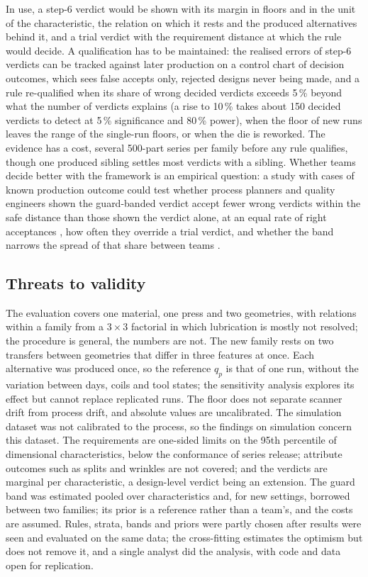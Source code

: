 \documentclass[pdflatex,sn-basic,lineno]{sn-jnl}
\begin{document}
In use, a step-6 verdict would be shown with its margin in floors and in the unit of the characteristic, the relation on which it rests and the produced alternatives behind it, and a trial verdict with the requirement distance at which the rule would decide. A qualification has to be maintained: the realised errors of step-6 verdicts can be tracked against later production on a control chart of decision outcomes, which sees false accepts only, rejected designs never being made, and a rule re-qualified when its share of wrong decided verdicts exceeds 5\,\% beyond what the number of verdicts explains (a rise to 10\,\% takes about 150 decided verdicts to detect at 5\,\% significance and 80\,\% power), when the floor of new runs leaves the range of the single-run floors, or when the die is reworked. The evidence has a cost, several 500-part series per family before any rule qualifies, though one produced sibling settles most verdicts with a sibling. Whether teams decide better with the framework is an empirical question: a study with cases of known production outcome could test whether process planners and quality engineers shown the guard-banded verdict accept fewer wrong verdicts within the safe distance than those shown the verdict alone, at an equal rate of right acceptances \citep{lee2004trust}, how often they override a trial verdict, and whether the band narrows the spread of that share between teams \citep{zhang2021cautionary}.

\subsection{Threats to validity}

The evaluation covers one material, one press and two geometries, with relations within a family from a $3\times3$ factorial in which lubrication is mostly not resolved; the procedure is general, the numbers are not. The new family rests on two transfers between geometries that differ in three features at once. Each alternative was produced once, so the reference $q_p$ is that of one run, without the variation between days, coils and tool states; the sensitivity analysis explores its effect but cannot replace replicated runs. The floor does not separate scanner drift from process drift, and absolute values are uncalibrated. The simulation dataset was not calibrated to the process, so the findings on simulation concern this dataset. The requirements are one-sided limits on the 95th percentile of dimensional characteristics, below the conformance of series release; attribute outcomes such as splits and wrinkles are not covered; and the verdicts are marginal per characteristic, a design-level verdict being an extension. The guard band was estimated pooled over characteristics and, for new settings, borrowed between two families; its prior is a reference rather than a team's, and the costs are assumed. Rules, strata, bands and priors were partly chosen after results were seen and evaluated on the same data; the cross-fitting estimates the optimism but does not remove it, and a single analyst did the analysis, with code and data open for replication.
\end{document}
